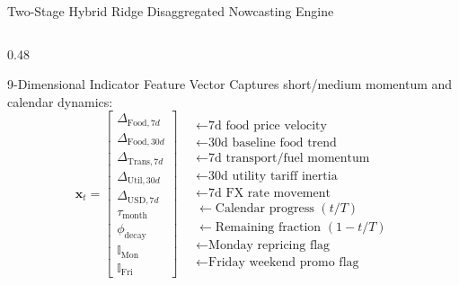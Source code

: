 \documentclass[aspectratio=169, 10pt]{beamer}
\begin{document}
\begin{frame}[shrink=15]{Two-Stage Hybrid Ridge Disaggregated Nowcasting Engine}
\begin{columns}
    \begin{column}{0.48\textwidth}
      \begin{block}{9-Dimensional Indicator Feature Vector}
        \small
        Captures short/medium momentum and calendar dynamics:
        \begin{equation*}
          \mathbf{x}_t = \begin{bmatrix}
            \Delta_{\text{Food}, 7d} \\
            \Delta_{\text{Food}, 30d} \\
            \Delta_{\text{Trans}, 7d} \\
            \Delta_{\text{Util}, 30d} \\
            \Delta_{\text{USD}, 7d} \\
            \tau_{\text{month}} \\
            \phi_{\text{decay}} \\
            \mathbb{I}_{\text{Mon}} \\
            \mathbb{I}_{\text{Fri}}
          \end{bmatrix} \quad \begin{array}{l}
            \leftarrow \text{7d food price velocity} \\
            \leftarrow \text{30d baseline food trend} \\
            \leftarrow \text{7d transport/fuel momentum} \\
            \leftarrow \text{30d utility tariff inertia} \\
            \leftarrow \text{7d FX rate movement} \\
            \leftarrow \text{Calendar progress } (t/T) \\
            \leftarrow \text{Remaining fraction } (1-t/T) \\
            \leftarrow \text{Monday repricing flag} \\
            \leftarrow \text{Friday weekend promo flag}
          \end{array}
        \end{equation*}
      \end{block}
    \end{column}
  \end{columns}
\end{frame}
\end{document}
